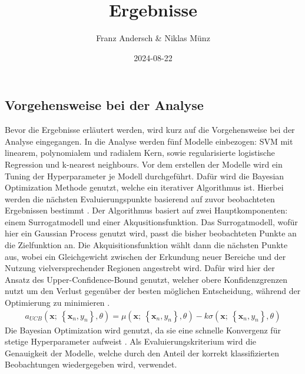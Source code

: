 \documentclass[
]{article}
\title{Ergebnisse}
\author{Franz Andersch \& Niklas Münz}
\date{2024-08-22}
\renewcommand{\maketitle}{}
\begin{document}
\maketitle

\subsection{Vorgehensweise bei der Analyse}

Bevor die Ergebnisse erläutert werden, wird kurz auf die Vorgehensweise
bei der Analyse eingegangen. In die Analyse werden fünf Modelle
einbezogen: SVM mit linearem, polynomialem und radialem Kern, sowie
regularisierte logistische Regression und k-nearest neighbours.\newline
Vor dem erstellen der Modelle wird ein Tuning der Hyperparameter je
Modell durchgeführt. Dafür wird die Bayesian Optimization Methode
genutzt, welche ein iterativer Algorithmus ist. Hierbei werden die
nächsten Evaluierungspunkte basierend auf zuvor beobachteten Ergebnissen
bestimmt \parencite{yangHyperparameterOptimizationMachine2020}. Der
Algorithmus basiert auf zwei Hauptkomponenten: einem Surrogatmodell und
einer Akqusitionsfunktion. Das Surrogatmodell, wofür hier ein Gaussian
Process genutzt wird, passt die bisher beobachteten Punkte an die
Zielfunktion an. Die Akquisitionsfunktion wählt dann die nächsten Punkte
aus, wobei ein Gleichgewicht zwischen der Erkundung neuer Bereiche und
der Nutzung vielversprechender Regionen angestrebt wird. Dafür wird hier
der Ansatz des Upper-Confidence-Bound genutzt, welcher obere
Konfidenzgrenzen nutzt um den Verlust gegenüber der besten möglichen
Entscheidung, während der Optimierung zu minimieren
\parencite{snoekPracticalBayesianOptimization2012}. \begin{align}
a_{UCB}(\mathbf{x};~\left\{\mathbf{x}_n,y_n\right\},\theta) = \mu(\mathbf{x};~\left\{\mathbf{x}_n,y_n\right\},\theta) - k \sigma(\mathbf{x};~\left\{\mathbf{x}_n,y_n\right\},\theta)
\end{align} Die Bayesian Optimization wird genutzt, da sie eine schnelle
Konvergenz für stetige Hyperparameter aufweist
\parencite{yangHyperparameterOptimizationMachine2020}. Als
Evaluierungskriterium wird die Genauigkeit der Modelle, welche durch den
Anteil der korrekt klassifizierten Beobachtungen wiedergegeben wird,
verwendet.
\end{document}
